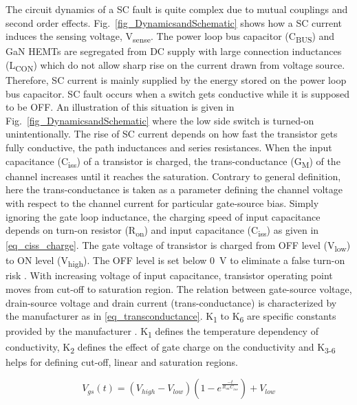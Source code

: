 \documentclass[journal]{IEEEtran}
\begin{document}
The circuit dynamics of a SC fault is quite complex due to mutual couplings and second order effects. Fig.~\ref{fig_DynamicsandSchematic} shows how a SC current induces the sensing voltage, V\textsubscript{sense}. The power loop bus capacitor (C\textsubscript{BUS}) and GaN HEMTs are segregated from DC supply with large connection inductances (L\textsubscript{CON}) which do not allow sharp rise on the current drawn from voltage source. Therefore, SC current is mainly supplied by the energy stored on the power loop bus capacitor. SC fault occurs when a switch gets conductive while it is supposed to be OFF. An illustration of this situation is given in Fig.~\ref{fig_DynamicsandSchematic} where the low side switch is turned-on unintentionally. The rise of SC current depends on how fast the transistor gets fully conductive, the path inductances and series resistances. When the input capacitance (C\textsubscript{iss}) of a transistor is charged, the trans-conductance (G\textsubscript{M}) of the channel increases until it reaches the saturation. Contrary to general definition, here the trans-conductance is taken as a parameter defining the channel voltage with respect to the channel current for particular gate-source bias. Simply ignoring the gate loop inductance, the charging speed of input capacitance depends on turn-on resistor (R\textsubscript{on}) and input capacitance (C\textsubscript{iss}) as given in \eqref{eq_ciss_charge}. The gate voltage of transistor is charged from OFF level (V\textsubscript{low}) to ON level (V\textsubscript{high}). The OFF level is set below 0~V to eliminate a false turn-on risk \cite{Xie2017}. With increasing voltage of input capacitance, transistor operating point moves from cut-off to saturation region. The relation between gate-source voltage, drain-source voltage and drain current (trans-conductance) is characterized by the manufacturer as in \eqref{eq_transconductance}.  K\textsubscript{1} to K\textsubscript{6} are specific constants provided by the manufacturer \cite{GaNSystemsSpice2016}. K\textsubscript{1} defines the temperature dependency of conductivity, K\textsubscript{2} defines the effect of gate charge on the conductivity and K\textsubscript{3-6} helps for defining cut-off, linear and saturation regions.

\begin{equation}
\label{eq_ciss_charge}
    V_{gs}(t) = (V_{high} - V_{low})(1-e^{\frac{-t}{R_{on}C_{iss}}}) +  V_{low}
\end{equation}
\end{document}
